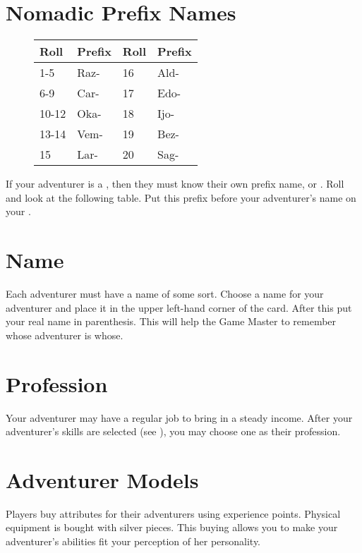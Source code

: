 \begin{multicols*}{2}
\section{Nomadic Prefix Names}
\begin{wrapfigure}[9]{l}[0pt]{5cm}
\begin{normbox}
\small
\begin{tabular}{l l|l l}
Roll & Prefix & Roll & Prefix\\
\midrule
1-5 & Raz- & 16 & Ald-\\
6-9 & Car- & 17 & Edo-\\
10-12 & Oka- & 18 & Ijo-\\
13-14 & Vem- & 19 & Bez-\\
15 & Lar- & 20 & Sag-\\
\end{tabular}
\normalsize
\end{normbox}
\end{wrapfigure}
If your adventurer is a , then they must know their own prefix name, or . Roll  and look at the following table. Put this prefix before your adventurer's name on your .

\section{Name}
Each adventurer must have a name of some sort. Choose a name for your adventurer and place it in the upper left-hand corner of the card. After this put your real name in parenthesis. This will help the Game Master to remember whose adventurer is whose.
\section{Profession}
Your adventurer may have a regular job to bring in a steady income. After your adventurer's skills are selected (see ), you may choose one as their profession.
\pagebreak
\section{Adventurer Models}
Players buy attributes for their adventurers using experience points. Physical equipment is bought with silver pieces. This buying allows you to make your adventurer's abilities fit your perception of her personality.


\end{multicols*}
